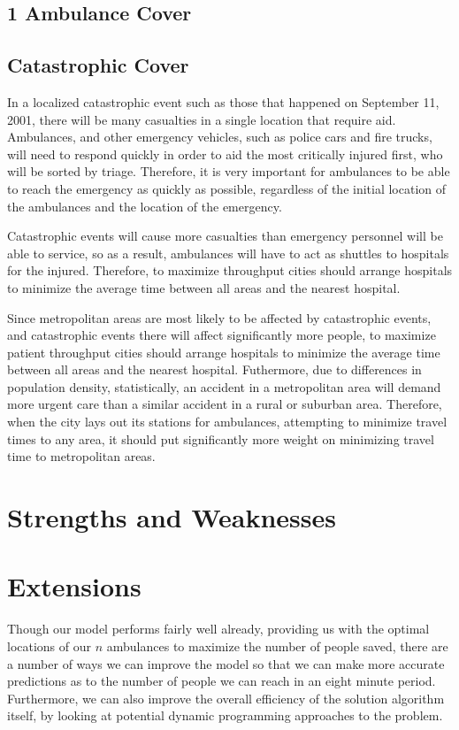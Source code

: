 \documentclass[notitlepage, 12pt]{article}
\begin{document}
\subsection{1 Ambulance Cover}

\subsection{Catastrophic Cover}
In a localized catastrophic event such as those that happened on September 11, 2001, there will be
many casualties in a single location that require aid. Ambulances, and other emergency vehicles,
such as police cars and fire trucks, will need to respond quickly in order to aid the most critically
injured first, who will be sorted by triage. Therefore, it is very important for ambulances to be able to
reach the emergency as quickly as possible, regardless of the initial location of the ambulances and the
location of the emergency.

Catastrophic events will cause more casualties than emergency personnel will be able to service, so as a result,
ambulances will have to act as shuttles to hospitals for the injured. Therefore, to maximize throughput
cities should arrange hospitals to minimize the average time between all areas and the nearest
hospital.

Since metropolitan areas are most likely to be affected by catastrophic events, and catastrophic events there
will affect significantly more people, to maximize patient throughput cities should arrange hospitals to minimize
the average time between all areas and the nearest hospital. Futhermore, due to differences in population density,
statistically, an accident in a metropolitan area will demand more urgent care than a similar accident
in a rural or suburban area. Therefore, when the city lays out its stations for ambulances, attempting to minimize
travel times to any area, it should put significantly more weight on minimizing travel time to metropolitan areas.

\section{Strengths and Weaknesses}

\section{Extensions}
Though our model performs fairly well already, providing us with the optimal locations of our $n$ ambulances to maximize the number of people saved, there are a number of ways we can improve the model so that we can make more accurate predictions as to the number of people we can reach in an eight minute period. Furthermore, we can also improve the overall efficiency of the solution algorithm itself, by looking at potential dynamic programming approaches to the problem. 
\end{document}
